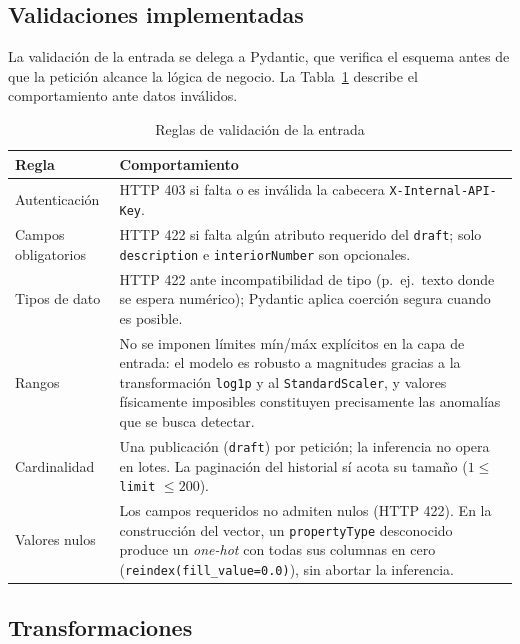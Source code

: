 \subsection{Validaciones implementadas}

La validación de la entrada se delega a Pydantic, que verifica el esquema antes
de que la petición alcance la lógica de negocio. La Tabla~\ref{tab:validaciones}
describe el comportamiento ante datos inválidos.

\begin{table}[H]
  \centering
  \caption{Reglas de validación de la entrada}
  \label{tab:validaciones}
  \small
  \begin{tabular}{@{}p{3.2cm}p{9.5cm}@{}}
    \toprule
    Regla & Comportamiento \\
    \midrule
    Autenticación & HTTP 403 si falta o es inválida la cabecera \texttt{X-Internal-API-Key}. \\
    Campos obligatorios & HTTP 422 si falta algún atributo requerido del \texttt{draft}; solo \texttt{description} e \texttt{interiorNumber} son opcionales. \\
    Tipos de dato & HTTP 422 ante incompatibilidad de tipo (p.\ ej.\ texto donde se espera numérico); Pydantic aplica coerción segura cuando es posible. \\
    Rangos & No se imponen límites mín/máx explícitos en la capa de entrada: el modelo es robusto a magnitudes gracias a la transformación \texttt{log1p} y al \texttt{StandardScaler}, y valores físicamente imposibles constituyen precisamente las anomalías que se busca detectar. \\
    Cardinalidad & Una publicación (\texttt{draft}) por petición; la inferencia no opera en lotes. La paginación del historial sí acota su tamaño ($1 \le$ \texttt{limit} $\le 200$). \\
    Valores nulos & Los campos requeridos no admiten nulos (HTTP 422). En la construcción del vector, un \texttt{propertyType} desconocido produce un \textit{one-hot} con todas sus columnas en cero (\texttt{reindex(fill\_value=0.0)}), sin abortar la inferencia. \\
    \bottomrule
  \end{tabular}
\end{table}

\subsection{Transformaciones}

